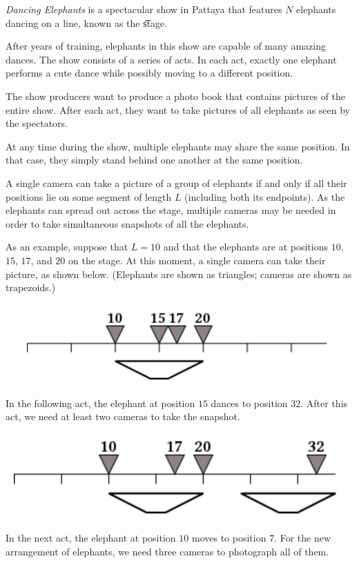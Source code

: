 \textit{Dancing Elephants} is a spectacular show in Pattaya that features $N$ elephants dancing on a line,
known as the \t{stage}.

After years of training, elephants in this show are capable of many amazing dances. The show
consists of a series of acts. In each act, exactly one elephant performs a cute dance while possibly
moving to a different position.

The show producers want to produce a photo book that contains pictures of the entire show. After each act, they want to take pictures of all elephants as seen by the spectators.

At any time during the show, multiple elephants may share the same position. In that case, they
simply stand behind one another at the same position.

A single camera can take a picture of a group of elephants if and only if all their positions lie on
some segment of length $L$ (including both its endpoints). As the elephants can spread out across
the stage, multiple cameras may be needed in order to take simultaneous snapshots of all the elephants.

As an example, suppose that $L=10$ and that the elephants are at positions $10$, $15$, $17$, and $20$ on the
stage. At this moment, a single camera can take their picture, as shown below. (Elephants are
shown as triangles; cameras are shown as trapezoids.)

\includegraphics[bb= 0 0 100 100]{elephants3.png}

In the following act, the elephant at position $15$ dances to position $32$. After this act, we need at
least two cameras to take the snapshot.

\includegraphics[bb= 0 0 100 100]{elephants2.png}

In the next act, the elephant at position $10$ moves to position $7$. For the new arrangement of elephants, we need three cameras to photograph all of them.

